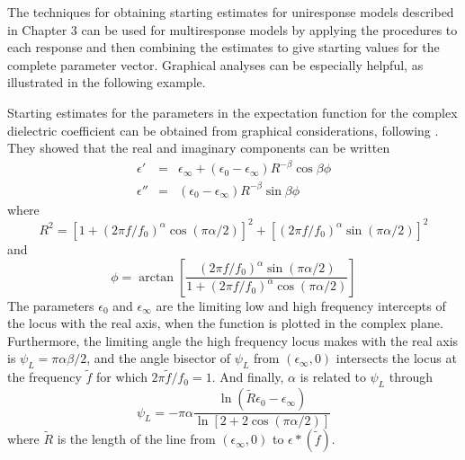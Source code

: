 The techniques for obtaining starting estimates for uniresponse
models described in Chapter 3 can be used for multiresponse
models by applying the procedures to each response and
then combining the estimates to give starting values for the complete
parameter vector.
Graphical analyses can be especially helpful, as illustrated in
the following example.

\begin{example}\label{spmma:graph}
Starting estimates for the parameters in the expectation
function for the complex dielectric coefficient can be obtained
from graphical considerations, following .
They showed that the real and imaginary components can be written
  \begin{eqnarray*}
    \epsilon'&=&\epsilon_{\infty} +
    ( \epsilon_0 - \epsilon_{\infty} ) R^{ - \beta }  \cos\beta \phi\\
    \epsilon''&=&
( \epsilon_0 - \epsilon_{\infty} ) R^{{-} \beta}  \sin\beta \phi
  \end{eqnarray*}
where
\begin{displaymath}
R^2 =
\left[ 1 + ( 2 \pi f / f_0 )^{\alpha}
\cos ( \pi \alpha / 2 )\right]^2
+ \left[ ( 2 \pi f / f_0 )^{\alpha}
\sin ( \pi \alpha / 2 )\right]^2
\end{displaymath}
and
\begin{displaymath}
\phi = \arctan \left[
\frac{ ( 2 \pi f / f_0 )^{\alpha}
\sin ( \pi \alpha / 2 )}{
1+( 2 \pi f / f_0 )^{\alpha}
\cos ( \pi \alpha / 2 ) }\right]
\end{displaymath}
The parameters $\epsilon_{0}$ and $\epsilon_{\infty}$ are the
limiting low and high frequency intercepts of the locus with the
real axis, when the function is plotted in the complex plane.
Furthermore, the limiting angle the high frequency locus makes
with the real axis is
$ \psi_L = \pi \alpha \beta / 2 $, and the angle
bisector of $ \psi_L $ from $( \epsilon_{\infty} , 0 )$ intersects the
locus at the frequency $\tilde f $ for which
$2 \pi \tilde f / f_0 = 1$.
And finally, $\alpha$ is related to $ \psi_L $
through
\begin{displaymath}
\psi_L = - \pi \alpha
\frac{\ln\left(\tilde{R}{\epsilon_0-\epsilon_{\infty}}\right)}
{\ln[2+2\cos(\pi\alpha/2)]}
\end{displaymath}
where $\tilde R $ is the length of the line from
$( \epsilon_{\infty} , 0 )$ to $\epsilon * ( \tilde f ) $.


\end{example}
